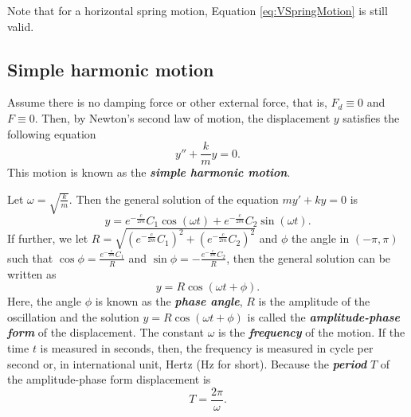 Note that for a horizontal spring motion, Equation \eqref{eq:VSpringMotion} is still valid.

\subsection{Simple harmonic motion}
Assume there is no damping force or other external force, that is, $F_d\equiv 0$ and $F\equiv 0$. Then, by Newton's second law of motion, the displacement $y$ satisfies the following equation
\[y''+\frac{k}{m}y=0.\]
This motion is known as the \emph{\textbf{simple harmonic motion}}.


Let $\omega=\sqrt{\frac km}$. Then the general solution of the equation $my'+ky=0$ is
\[y=e^{-\frac{c}{2m}}C_1\cos(\omega t)+e^{-\frac{c}{2m}}C_2\sin(\omega t).\]
If further, we let $R=\sqrt{\left(e^{-\frac{c}{2m}}C_1\right)^2+\left(e^{-\frac{c}{2m}}C_2\right)^2}$ and  $\phi$ the angle in $(-\pi,\pi)$ such that $\cos\phi=\frac{e^{-\frac{c}{2m}}C_1}{R}$ and $\sin\phi=-\frac{e^{-\frac{c}{2m}}C_2}{R}$, then the general solution can be written as
\[y=R\cos(\omega t+\phi).\]
Here, the angle $\phi$ is known as the \emph{\textbf{phase angle}},  $R$ is the amplitude of the oscillation and the solution $y=R\cos(\omega t+\phi)$ is called the \emph{\textbf{amplitude-phase form}} of the displacement. The constant $\omega$ is the \emph{\textbf{frequency}} of the motion. If the time $t$ is measured in seconds, then, the frequency is measured in cycle per second or, in international unit, Hertz (Hz for short). Because the \emph{\textbf{period}} $T$ of the amplitude-phase form displacement is 
\[T=\frac{2\pi}{\omega}.\]

